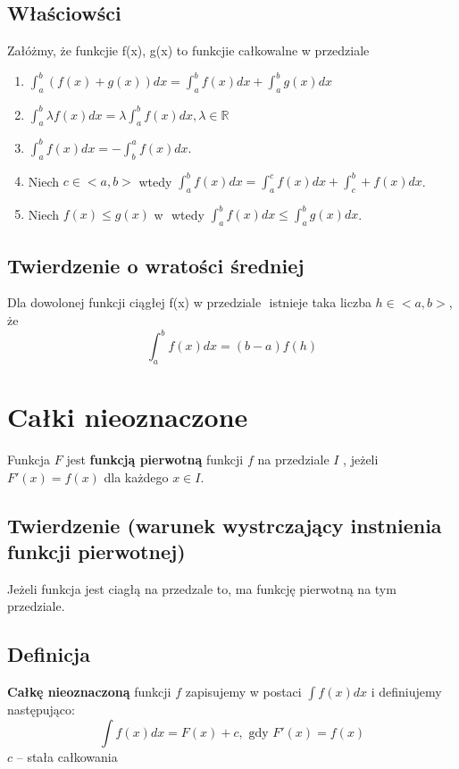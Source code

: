 \documentclass[11pt]{article}
\begin{document}
\subsection{Właściowści}
\label{sec:org9f24b4e}
Załóżmy, że funkcjie f(x), g(x) to funkcjie całkowalne w przedziale \(<a,b>\)
\begin{enumerate}
\item \(\displaystyle\int_a^b( f(x) + g(x) )dx
   = \int_a^b f(x) dx + \int_a^b g(x)dx\)
\item \(\displaystyle \int_a^b \lambda f(x) dx = \lambda \int_a^b f(x)dx, \lambda \in \mathbb{R}\)
\item \(\displaystyle \int_a^b f(x) dx = - \int_b^a f(x) dx\).
\item Niech \(c \in <a,b>\) wtedy \(\displaystyle \int_a^b f(x)dx = \int_a^c f(x)dx + \int_c^b+f(x)dx\).
\item Niech \(f(x) \le g(x)\) w \(<a, b>\) wtedy \(\displaystyle \int_a^b f(x)dx \le \int_a^b g(x)dx\).
\end{enumerate}
\subsection{Twierdzenie o wratości średniej}
\label{sec:orgac3b3dc}
Dla dowolonej funkcji ciągłej f(x) w przedziale \(<a,b>\) istnieje taka liczba \(h \in <a,b>\), że
$$\int_a^b f(x)dx = (b-a)f(h)$$
\newpage
\section{Całki nieoznaczone}
\label{sec:orgacf6d0d}
Funkcja \(F\) jest \textbf{funkcją pierwotną} funkcji \(f\) na przedziale \(I\) , jeżeli \(F'(x) = f(x)\) dla każdego \(x \in I\).
\subsection{Twierdzenie (warunek wystrczający instnienia funkcji pierwotnej)}
\label{sec:orgc11bd7e}
Jeżeli funkcja jest ciagłą na przedzale to, ma funkcję pierwotną na tym przedziale.
\subsection{Definicja}
\label{sec:orgb0671a1}
\textbf{Całkę nieoznaczoną} funkcji \(f\) zapisujemy w postaci \(\int f(x)dx\) i definiujemy następująco:
$$\int f(x) dx = F(x) + c, \text{ gdy }F'(x) = f(x)$$
\(c\) -- stała całkowania
\end{document}
